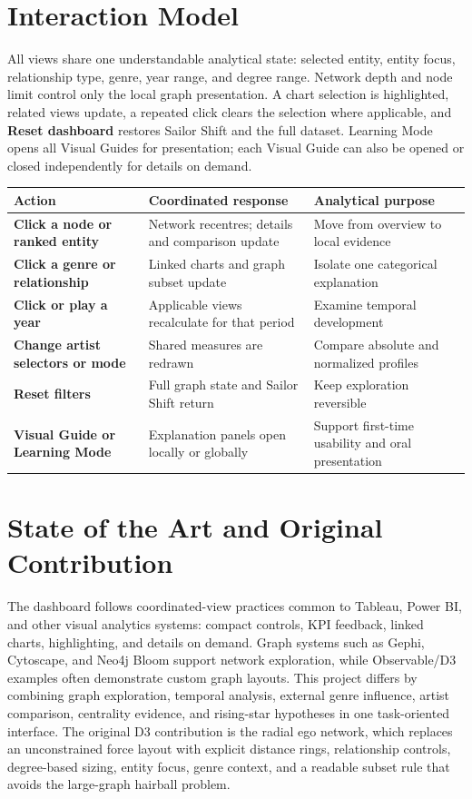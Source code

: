 \documentclass[9pt,a4paper]{article}
\begin{document}
\section{Interaction Model}
All views share one understandable analytical state: selected entity, entity focus, relationship type, genre, year range, and degree range. Network depth and node limit control only the local graph presentation. A chart selection is highlighted, related views update, a repeated click clears the selection where applicable, and \textbf{Reset dashboard} restores Sailor Shift and the full dataset. Learning Mode opens all Visual Guides for presentation; each Visual Guide can also be opened or closed independently for details on demand.

\begin{table}[H]\centering\small
\begin{tabularx}{\textwidth}{>{\bfseries}p{2.7cm} >{\raggedright\arraybackslash}X >{\raggedright\arraybackslash}X}
\toprule
Action & Coordinated response & Analytical purpose \\
\midrule
Click a node or ranked entity & Network recentres; details and comparison update & Move from overview to local evidence \\
Click a genre or relationship & Linked charts and graph subset update & Isolate one categorical explanation \\
Click or play a year & Applicable views recalculate for that period & Examine temporal development \\
Change artist selectors or mode & Shared measures are redrawn & Compare absolute and normalized profiles \\
Reset filters & Full graph state and Sailor Shift return & Keep exploration reversible \\
Visual Guide or Learning Mode & Explanation panels open locally or globally & Support first-time usability and oral presentation \\
\bottomrule
\end{tabularx}
\end{table}

\section{State of the Art and Original Contribution}
The dashboard follows coordinated-view practices common to Tableau, Power BI, and other visual analytics systems: compact controls, KPI feedback, linked charts, highlighting, and details on demand. Graph systems such as Gephi, Cytoscape, and Neo4j Bloom support network exploration, while Observable/D3 examples often demonstrate custom graph layouts. This project differs by combining graph exploration, temporal analysis, external genre influence, artist comparison, centrality evidence, and rising-star hypotheses in one task-oriented interface. The original D3 contribution is the radial ego network, which replaces an unconstrained force layout with explicit distance rings, relationship controls, degree-based sizing, entity focus, genre context, and a readable subset rule that avoids the large-graph hairball problem.
\end{document}
